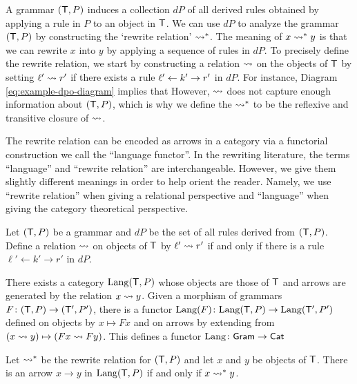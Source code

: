 \documentclass{amsart}
\begin{document}
A grammar $( \mathsf{T},P )$ induces a collection $dP$ of
all derived rules obtained by applying a rule in
$P$ to an object in $\mathsf{T}$.  We can use $dP$ to
analyze the grammar $(\mathsf{T},P)$ by constructing the
`rewrite relation' $\rightsquigarrow^\ast$. The meaning
of $x \rightsquigarrow^\ast y$ is that we can rewrite $x$ into
$y$ by applying a sequence of rules in $dP$. To
precisely define the rewrite relation, we start by
constructing a relation $ \rightsquigarrow $ on the
objects of $ \mathsf{T} $ by setting
$ \ell' \rightsquigarrow r' $ if there exists a rule
$ \ell' \leftarrow k' \to r' $ in $ dP $. For instance,
Diagram \eqref{eq:example-dpo-diagram} implies
that  However,
$ \rightsquigarrow $ does not capture enough
information about $( \mathsf{T},P )$, which is why we
define the  $ \rightsquigarrow^\ast $ to
be the reflexive and transitive closure of
$ \rightsquigarrow $.

The rewrite relation can be encoded as arrows in a
category via a functorial construction we call the
``language functor''. In the rewriting literature,
the terms ``language'' and ``rewrite relation''
are interchangeable. However, we give them slightly
different meanings in order to help orient the
reader. Namely, we use ``rewrite relation'' when
giving a relational perspective and ``language''
when giving the category theoretical perspective.

\begin{theorem}
  \label{thm:Lang_from_Gram_to_Cat}
  Let $ (\mathsf{T},P) $ be a grammar and $ dP $ be the
  set of all rules derived from $ ( \mathsf{T},P )
  $. Define a relation $ \rightsquigarrow $ on objects
  of $ \mathsf{T} $ by $ \ell' \rightsquigarrow r' $ if and only
  if there is a rule $ \ell' \gets k' \to r' $ in
  $ dP $.

  There exists a category $ \mathrm{Lang} (\mathsf{T},P) $
  whose objects are those of $ \mathsf{T} $ and arrows are
  generated by the relation $ x \rightsquigarrow y
  $. Given a morphism of grammars
  $ F \colon (\mathsf{T},P) \to (\mathsf{T}',P') $, there is a
  functor
  $ \mathrm{Lang} (F) \colon \mathrm{Lang} (\mathsf{T},P) \to \mathrm{Lang}
  (\mathsf{T}',P') $ defined on objects by
  $ x \mapsto Fx $ and on arrows by extending from
  $ (x \rightsquigarrow y) \mapsto ( Fx \rightsquigarrow Fy )
  $. This defines a functor
  $ \mathrm{Lang} \colon \mathsf{Gram} \to \mathsf{Cat} $
\end{theorem}

\begin{corollary}
  Let $ \rightsquigarrow^\ast $ be the rewrite relation for
  $ ( \mathsf{T},P ) $ and let $ x $ and $ y $ be objects
  of $ \mathsf{T} $. There is an arrow $ x \to y $ in
  $ \mathrm{Lang} (\mathsf{T},P) $ if and only if
  $ x \rightsquigarrow^\ast y $.
\end{corollary}
\end{document}
